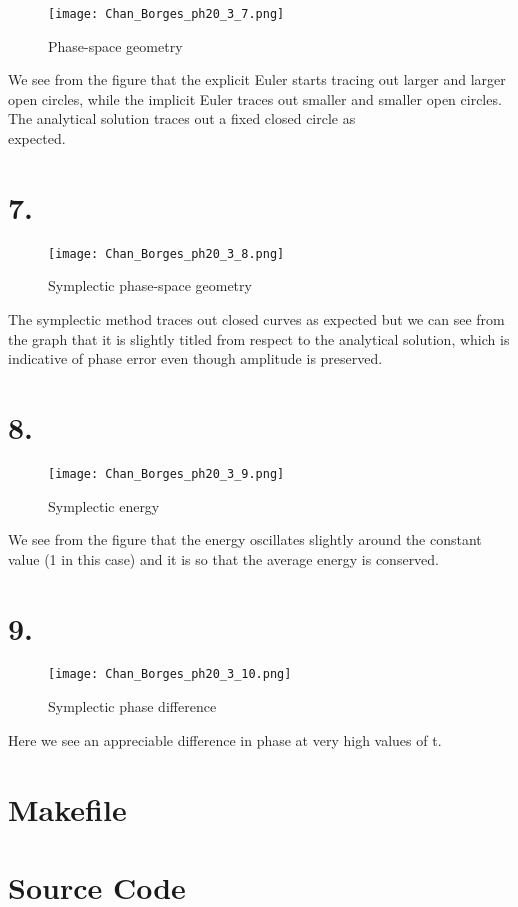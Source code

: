\documentclass[12pt]{article}
\begin{document}
\begin{figure}[h]
\texttt{[image: Chan\_Borges\_ph20\_3\_7.png]}
\caption{Phase-space geometry}
\end{figure}

\noindent We see from the figure that the explicit Euler starts tracing out larger and larger open circles, while the implicit Euler traces out smaller and smaller open circles. The analytical solution traces out a fixed closed circle as \\ expected. 

\newpage

\section*{7.}

\begin{figure}[h]
\texttt{[image: Chan\_Borges\_ph20\_3\_8.png]}
\caption{Symplectic phase-space geometry}
\end{figure}

\noindent The symplectic method traces out closed curves as expected but we can see from the graph that it is slightly titled from respect to the analytical solution, which is indicative of phase error even though amplitude is preserved.

\newpage

\section*{8.}

\begin{figure}[h]
\texttt{[image: Chan\_Borges\_ph20\_3\_9.png]}
\caption{Symplectic energy}
\end{figure}

\noindent We see from the figure that the energy oscillates slightly around the constant value (1 in this case) and it is so that the average energy is conserved. 

\newpage

\section*{9.}
\begin{figure}[h]
\texttt{[image: Chan\_Borges\_ph20\_3\_10.png]}
\caption{Symplectic phase difference}
\end{figure}

Here we see an appreciable difference in phase at very high values of t. 

\newpage
\section*{Makefile}


\newpage
\section*{Source Code}
\inputminted{python}{Chan_Borges_Ph20_Assignment_3.py}
\end{document}
